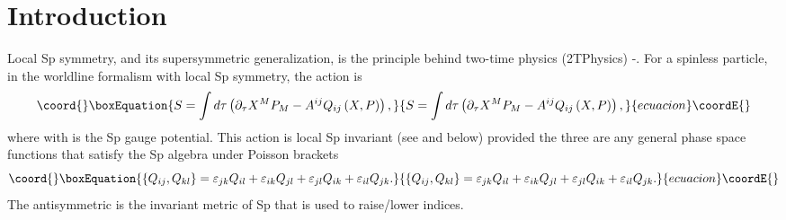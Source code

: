\documentclass[a4paper,12pt]{article}
\begin{document}
\section{Introduction}

Local Sp\myHighlight{$\left( 2\right) $}\coordHE{} symmetry, and its supersymmetric generalization,
is the principle behind two-time physics (2TPhysics) \cite{survey2T}-\cite
{ncsp}. For a spinless particle, in the worldline formalism with local Sp\myHighlight{$%
\left( 2\right) $}\coordHE{} symmetry, the action is
\begin{equation}\coord{}\boxEquation{
S=\int d\tau \left( \partial _{\tau }X^{M}P_{M}-A^{ij}Q_{ij}\left(
X,P\right) \right) ,  \label{worldlineaction}
}{
S=\int d\tau \left( \partial _{\tau }X^{M}P_{M}-A^{ij}Q_{ij}\left(
X,P\right) \right) ,  }{ecuacion}\coordE{}\end{equation}
where \coordHE{} with \coordHE{}
is the Sp\myHighlight{$\left( 2\right) $}\coordHE{} gauge potential. This action is local Sp\myHighlight{$\left(
2\right) $}\coordHE{} invariant (see \cite{emgrav} and below) provided the three \coordHE{} are any general phase space functions that satisfy
the Sp\myHighlight{$\left( 2\right) $}\coordHE{} algebra under Poisson brackets
\begin{equation}\coord{}\boxEquation{
\left\{ Q_{ij},Q_{kl}\right\} =\varepsilon _{jk}Q_{il}+\varepsilon
_{ik}Q_{jl}+\varepsilon _{jl}Q_{ik}+\varepsilon _{il}Q_{jk}.  \label{poisson}
}{
\left\{ Q_{ij},Q_{kl}\right\} =\varepsilon _{jk}Q_{il}+\varepsilon
_{ik}Q_{jl}+\varepsilon _{jl}Q_{ik}+\varepsilon _{il}Q_{jk}.  }{ecuacion}\coordE{}\end{equation}
The antisymmetric \coordHE{} is the invariant
metric of Sp\myHighlight{$\left( 2\right) $}\coordHE{} that is used to raise/lower indices.
\end{document}
